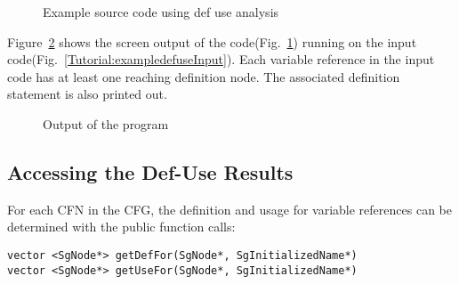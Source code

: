 \begin{figure}[!h]
{\indent
{\mySmallFontSize
\begin{latexonly}
   
\end{latexonly}

\begin{htmlonly}
   
\end{htmlonly}

}
}
\caption{Example source code using def use analysis}
\label{Tutorial:defuseCode}
\end{figure}


Figure~\ref{Tutorial:defuse.output} shows the screen output of the
code(Fig.~\ref{Tutorial:defuseCode}) running on the input
code(Fig.~\ref{Tutorial:exampledefuseInput}). 
Each variable reference in the input code has at least one reaching definition node. The associated definition
statement is also printed out.   

\begin{figure}[!h]
{\indent
{\mySmallFontSize

\begin{latexonly}
   
\end{latexonly}

\begin{htmlonly}
   
\end{htmlonly}

}
}
\caption{Output of the program}
\label{Tutorial:defuse.output}
\end{figure}


\subsection{Accessing the Def-Use Results}
For each CFN in the CFG, the definition and usage for 
variable references can be determined with the public function calls:

\begin{verbatim}
vector <SgNode*> getDefFor(SgNode*, SgInitializedName*)
vector <SgNode*> getUseFor(SgNode*, SgInitializedName*)
\end{verbatim}

